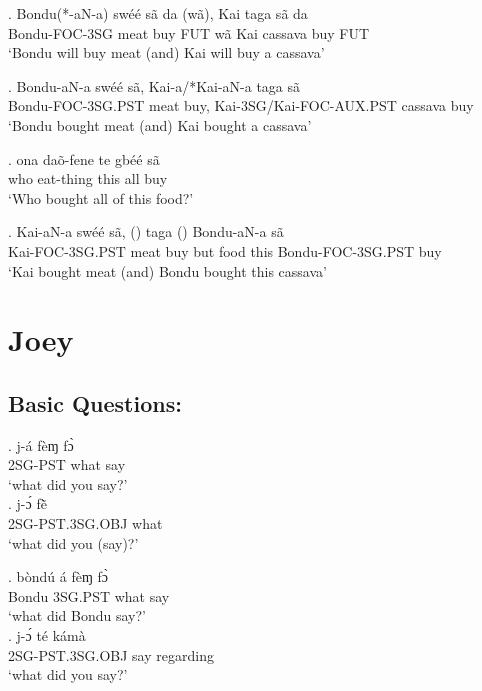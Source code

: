 \documentclass{assets/fieldnotes}
\begin{document}
\exg. Bondu(*-aN-a) swéé sã da (wã), Kai taga sã da\\
Bondu-FOC-3SG meat buy FUT wã Kai cassava buy FUT\\
`Bondu will buy meat (and) Kai will buy a cassava'\\

\exg. Bondu-aN-a swéé sã, Kai-a/*Kai-aN-a taga sã\\
Bondu-FOC-3SG.PST meat buy, Kai-3SG/Kai-FOC-AUX.PST cassava buy\\
`Bondu bought meat (and) Kai bought a cassava'

\exg. \textipa{\textltailn}ona daõ-fene te gbéé sã\\
who eat-thing this all buy\\
`Who bought all of this food?'

\exg. Kai-aN-a swéé sã, () taga () Bondu-aN-a sã\\
Kai-FOC-3SG.PST meat buy but food this Bondu-FOC-3SG.PST buy\\
`Kai bought meat (and) Bondu bought this cassava'



\section{Joey}

\subsection{Basic Questions:}

\exg. j-á fèɱ fɔ̀\\
2SG-PST what say\\
`what did you say?' \\

\exg. j-ɔ́ fẽ̀ \\
2SG-PST.3SG.OBJ what \\
`what did you (say)?' \\


\exg. bòndú á fèɱ fɔ̀\\
Bondu 3SG.PST what say\\
`what did Bondu say?' \\

\exg. j-ɔ́ té kámà\\
2SG-PST.3SG.OBJ say regarding\\
`what did you say?' \\
\end{document}
